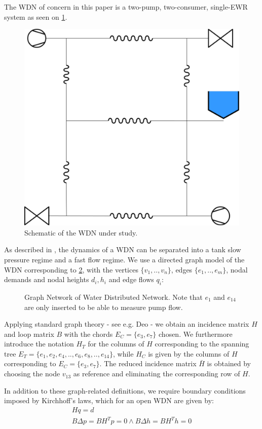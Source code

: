 The WDN of concern in this paper is a two-pump, two-consumer, single-EWR system as seen on \cref{fig:WDNModel}.

\begin{figure}[h]
	\centering
	\includegraphics[width=0.5\linewidth]{Graphics/WDNModel.pdf}
	\caption{Schematic of the WDN under study.}
	\label{fig:WDNModel}
\end{figure}

As described in , the dynamics of a WDN can be separated into a tank slow pressure regime and a fast flow regime. We use a directed graph model of the WDN corresponding to \cref{fig:tikzWDNGraph}, with the vertices $\{v_1,..,v_n\}$, edges $\{e_1,..,e_m\}$, nodal demands and nodal heights $d_i, h_i$ and edge flows $q_i$:

\begin{figure}[h!]
	\centering
	\resizebox{\columnwidth}{!}{
		}
		\caption{Graph Network of Water Distributed Network. Note that $e_1$ and $e_{14} $ are only inserted to be able to measure pump flow.}
	\label{fig:tikzWDNGraph}
\end{figure}  

Applying standard graph theory - see e.g. Deo \cite{Deo} - we obtain an incidence matrix $H$ and loop matrix $B$ with the chords $E_C=\{e_3,e_7\}$ chosen. We furthermore introduce the notation $H_T$ for the columns of $H$ corresponding to the spanning tree $E_T=\{e_1,e_2,e_4,..,e_6,e_8,..,e_{14}\}$, while $H_C$ is given by the columns of $H$ corresponding to $E_C=\{e_3,e_7\}$. The reduced incidence matrix $\bar{H}$ is obtained by choosing the node $ v_{13} $ as reference and eliminating the corresponding row of $H$.

In addition to these graph-related definitions, we require boundary conditions imposed by Kirchhoff's laws, which for an open WDN are given \cite{Rathore1030} by:
\begin{gather}
	Hq = d \label{eq:KirchNodeLaw} \\
	B\Delta p = B H^T p = 0 \wedge B\Delta h = B H^T h = 0 \label{eq:KirchMeshLaw}
\end{gather} 

